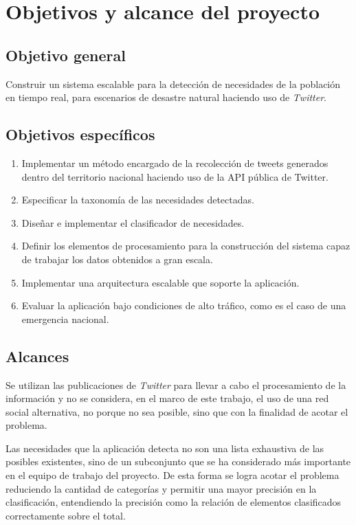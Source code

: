 \section{Objetivos y alcance del proyecto}
\label{intro:objetivos}

\subsection{Objetivo general}
	Construir un sistema escalable para la detección de necesidades de la población en tiempo real, para escenarios de desastre natural haciendo uso de \textit{Twitter}.

\subsection{Objetivos específicos}
\begin{enumerate}
\item	Implementar un método encargado de la recolección de tweets generados dentro del territorio nacional haciendo uso de la API pública de Twitter.
\item	Especificar la taxonomía de las necesidades detectadas.
\item	Diseñar e implementar el clasificador de necesidades.
\item	Definir los elementos de procesamiento para la construcción del sistema capaz de trabajar los datos obtenidos a gran escala.
\item	Implementar una arquitectura escalable que soporte la aplicación.
\item	Evaluar la aplicación bajo condiciones de alto tráfico, como es el caso de una emergencia nacional.
\end{enumerate}

\subsection{Alcances}
\label{subsec:alcances}

Se utilizan las publicaciones de \textit{Twitter} para llevar a cabo el procesamiento de la información y no se considera, en el marco de este trabajo, el uso de una red social alternativa, no porque no sea posible, sino que con la finalidad de acotar el problema.

Las necesidades que la aplicación detecta no son una lista exhaustiva de las posibles existentes, sino de un subconjunto que se ha considerado más importante en el equipo de trabajo del proyecto. De esta forma se logra acotar el problema reduciendo la cantidad de categorías y permitir una mayor precisión en la clasificación, entendiendo la precisión como la relación de elementos clasificados correctamente sobre el total.

